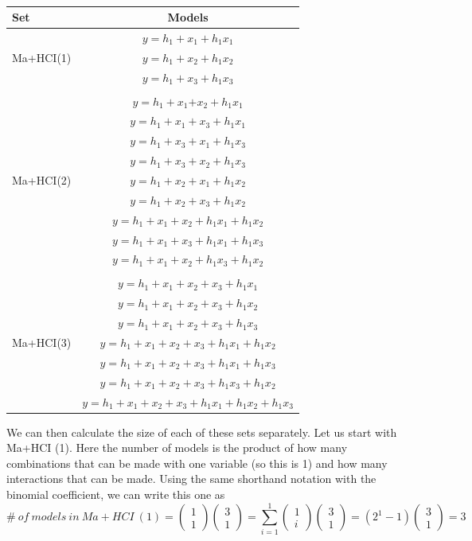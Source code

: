 \begin{table}
\caption{}
\centering
\begin{tabular}{lc}  
\toprule
Set & Models \\
\midrule
\multirow{3}{*}{Ma+HCI(1)} & $y=h_1+x_1+h_1x_1$\\ & $y=h_1+x_2+h_1x_2$\\ & $y=h_1+x_3+h_1x_3$\\ & \\ 
\multirow{9}{*}{Ma+HCI(2)} & $y=h_1+x_1$$+x_2+h_1x_1$\\ & $y=h_1+x_1+x_3+h_1x_1$\\ & $y=h_1+x_3+x_1+h_1x_3$\\ & $y=h_1+x_3+x_2+h_1x_3$\\ & $y=h_1+x_2+x_1+h_1x_2$\\ & $y=h_1+x_2+x_3+h_1x_2$\\ & $y=h_1+x_1+x_2+h_1x_1+h_1x_2$\\ & $y=h_1+x_1+x_3+h_1x_1+h_1x_3$\\ & $y=h_1+x_1+x_2+h_1x_3+h_1x_2$\\  & \\  
\multirow{7}{*}{Ma+HCI(3)} & $y=h_1+x_1+x_2+x_3+h_1x_1$\\ & $y=h_1+x_1+x_2+x_3+h_1x_2$\\ & $y=h_1+x_1+x_2+x_3+h_1x_3$\\ & $y=h_1+x_1+x_2+x_3+h_1x_1+h_1x_2$\\ & $y=h_1+x_1+x_2+x_3+h_1x_1+h_1x_3$\\ & $y=h_1+x_1+x_2+x_3+h_1x_3+h_1x_2$\\ & $y=h_1+x_1+x_2+x_3+h_1x_1+h_1x_2+h_1x_3$\\  
\bottomrule
\end{tabular}
\end{table}

We can then calculate the size of each of these sets separately. Let us start with Ma+HCI (1). Here the number of models is the product of how many combinations that can be made with one variable (so this is 1) and how many interactions that can be made. Using the same shorthand notation with the binomial coefficient, we can write this one as
\[\#\ of\ models\ in\ Ma+HCI\ \left(1\right)=\left( \begin{array}{c}
1 \\ 
1 \end{array}
\right)\left( \begin{array}{c}
3 \\ 
1 \end{array}
\right)=\sum^1_{i=1}{\left( \begin{array}{c}
1 \\ 
i \end{array}
\right)}\left( \begin{array}{c}
3 \\ 
1 \end{array}
\right)=\left(2^1-1\right)\left( \begin{array}{c}
3 \\ 
1 \end{array}
\right)=3\] 


